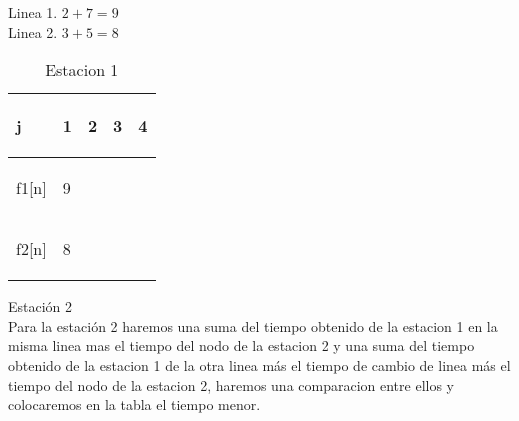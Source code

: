 \documentclass[12pt,twoside]{article}
\begin{document}
\begin{center}
   Linea 1.  $2 + 7 = 9$\\
   Linea 2.  $3 + 5 = 8$\\
    \begin{table}[!h]
        \centering

\begin{tabular}{|p{}|p{}|p{}|p{}|p{}|}
\hline
 \begin{center}
j
\end{center}
 & \begin{center}
1
\end{center}
 & \begin{center}
2
\end{center}
 & \begin{center}
3
\end{center}
 & \begin{center}
4
\end{center}
 \\
\hline
 \begin{center}
f1[n]
\end{center}
 & \begin{center}
9
\end{center}
 & \begin{center}
\end{center}
 & \begin{center}
\end{center}
 & \begin{center}
\end{center}
 \\
\hline
 \begin{center}
f2[n]
\end{center}
 & \begin{center}
8
\end{center}
 & \begin{center}
\end{center}
 & \begin{center}
\end{center}
 & \begin{center}
\end{center}
 \\
 \hline
\end{tabular}
        \caption{Estacion 1}
        \end{table}
\end{center}
 Estación 2\\
 Para la estación 2 haremos una suma del tiempo obtenido de la estacion 1 en la misma linea mas el tiempo del nodo de la estacion 2 y una suma del tiempo obtenido de la estacion 1 de la otra linea más el tiempo de cambio de linea más el tiempo del nodo de la estacion 2, haremos una comparacion entre ellos y colocaremos en la tabla el tiempo menor.\\
\end{document}
